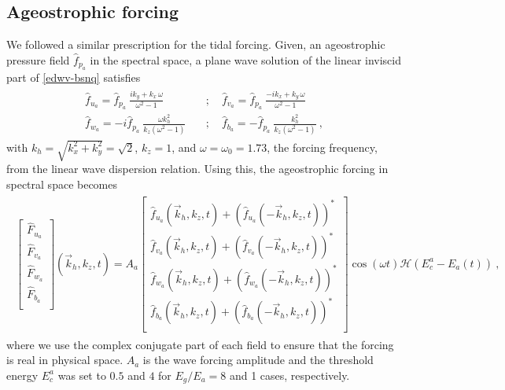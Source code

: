 \documentclass[../Rajarshi-thesis-draft.tex]{subfiles}
\begin{document}
\subsection{Ageostrophic forcing}
We followed a similar prescription for the tidal forcing. Given, an ageostrophic pressure field $\hat{f}_{p_a}$ in the spectral space, a plane wave solution of the linear inviscid part  of \eqref{edwv-bsnq} satisfies
\begin{align}
\label{edwv-linwv}
\begin{split}
	\hat{f}_{u_a} = \hat{f}_{p_a}\ \frac{ ik_y + k_x\,\omega}{\omega^2 -1}\quad &; \quad \hat{f}_{v_a}= \hat{f}_{p_a}\ \frac{-i k_x + k_y\,\omega}{\omega^2 -1} \\
	\hat{f}_{w_a} =-i \hat{f}_{p_a}\ \frac{ \omega k_h^2}{k_z \left( \omega^2 -1 \right)} \quad &; \quad \hat{f}_{b_a} = - \hat{f}_{p_a} \ \frac{ k_h^2}{k_z \left( \omega^2 -1 \right)} \ , 
\end{split}
\end{align}
with $k_h = \sqrt{k_x^2 + k_y^2} = \sqrt{2}$, $k_z = 1$, and $\omega=\omega_0 = 1.73$, the forcing frequency,  from the linear wave dispersion relation. Using this, the ageostrophic forcing in spectral space becomes 
\begin{align}
\begin{split}
	\begin{bmatrix}
		\hat{F}_{u_a}\\
		\hat{F}_{v_a}\\
		\hat{F}_{w_a}\\
		\hat{F}_{b_a}\\
	\end{bmatrix}(\vec{k}_h,k_z,t) = A_a \begin{bmatrix}
		\hat{f}_{u_a}(\vec{k}_h, k_z,t) + \left(\hat{f}_{u_a}(-\vec{k}_h, k_z,t)\right)^*\\
		\hat{f}_{v_a}(\vec{k}_h, k_z,t) + \left(\hat{f}_{v_a}(-\vec{k}_h, k_z,t)\right)^*\\
		\hat{f}_{w_a}(\vec{k}_h, k_z,t) + \left(\hat{f}_{w_a}(-\vec{k}_h, k_z,t)\right)^*\\
		\hat{f}_{b_a}(\vec{k}_h, k_z,t) + \left(\hat{f}_{b_a}(-\vec{k}_h, k_z,t)\right)^*\\
	\end{bmatrix} \cos(\omega t)\mathcal H \left(E_c^a - E_a(t)\right) \ ,
\end{split}
\end{align}
where we use the complex conjugate part of each field to ensure that the forcing is real in physical space.    $A_a$ is the wave forcing amplitude and  the threshold energy $E_c^a$ was set to $0.5$ and $4$ for $E_g/E_a = 8$ and 1 cases, respectively.
\end{document}
